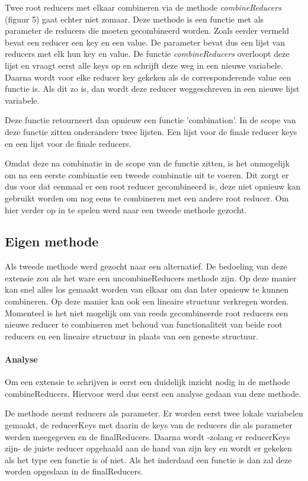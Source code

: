 Twee root reducers met elkaar combineren via de methode \textit{combineReducers} (figuur 5) gaat echter niet zomaar. Deze methode is een functie met als parameter de reducers die moeten gecombineerd worden. Zoals eerder vermeld bevat een reducer een key en een value. De parameter bevat dus een lijst van reducers met elk hun key en value. De functie \textit{combineReducers} overloopt deze lijst en vraagt eerst alle keys op en schrijft deze weg in een nieuwe variabele. Daarna wordt voor elke reducer key gekeken als de corresponderende value een functie is. Als dit zo is, dan wordt deze reducer weggeschreven in een nieuwe lijst variabele.   

Deze functie retourneert dan opnieuw een functie 'combination'. In de scope van deze functie zitten onderandere twee lijsten. Een lijst voor de finale reducer keys en een lijst voor de finale reducers. 
 
Omdat deze na combinatie in de scope van de functie zitten, is het onmogelijk om na een eerste combinatie een tweede combinatie uit te voeren. Dit zorgt er dus voor dat eenmaal er een root reducer gecombineerd is, deze niet opnieuw kan gebruikt worden om nog eens te combineren met een andere root reducer. Om hier verder op in te spelen werd naar een tweede methode gezocht. 

\subsection{Eigen methode}
Als tweede methode werd gezocht naar een alternatief. De bedoeling van deze extensie zou als het ware een uncombineReducers methode zijn. Op deze manier kan snel alles los gemaakt worden van elkaar om dan later opnieuw te kunnen combineren. Op deze manier kan ook een lineaire structuur verkregen worden. Momenteel is het niet mogelijk om van reeds gecombineerde root reducers een nieuwe reducer te combineren met behoud van functionaliteit van beide root reducers en een lineaire structuur in plaats van een geneste structuur. 

\paragraph{Analyse}
Om een extensie te schrijven is eerst een duidelijk inzicht nodig in de methode combineReducers. Hiervoor werd dus eerst een analyse gedaan van deze methode. 

De methode neemt reducers als parameter. Er worden eerst twee lokale variabelen gemaakt, de reducerKeys met daarin de keys van de reducers die als parameter werden meegegeven en de finalReducers. Daarna wordt -zolang er reducerKeys zijn- de juiste reducer opgehaald aan de hand van zijn key en wordt er gekeken als het type een functie is of niet. Als het inderdaad een functie is dan zal deze worden opgeslaan in de finalReducers.

